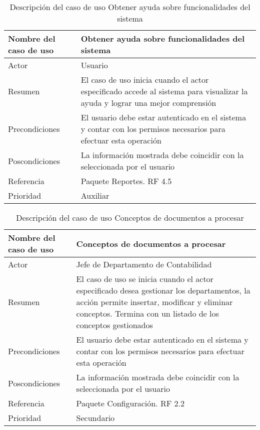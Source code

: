 \begin{table}[H]
	\sf
	\begin{supertabular}{|p{4.5cm}|p{12cm}|}
		\hline
		\textbf{Nombre del caso de uso}
		& \textbf{Obtener ayuda sobre funcionalidades del sistema} \\ \hline
		
		Actor
		& Usuario \\ \hline
		
		Resumen
		& El caso de uso inicia cuando el actor especificado accede al sistema para visualizar la ayuda y lograr una mejor comprensión \\ \hline
		
		Precondiciones
		& El usuario debe estar autenticado en el sistema y contar con los permisos necesarios para efectuar esta operación \\ \hline
		
		Poscondiciones
		& La información mostrada debe coincidir con la seleccionada por el usuario \\ \hline
		
		Referencia
		& Paquete Reportes. RF 4.5 \\ \hline
		
		Prioridad
		& Auxiliar \\		
		\hline
	\end{supertabular}
	\caption[Descripción del caso de uso Obtener ayuda sobre funcionalidades del sistema]{Descripción del caso de uso Obtener ayuda sobre funcionalidades del sistema}
	\label{table:CU_ObtAyuda}
\end{table}

\begin{table}[H]
	\sf
	\begin{supertabular}{|p{4.5cm}|p{12cm}|}
		\hline
		\textbf{Nombre del caso de uso}
		& \textbf{Conceptos de documentos a procesar} \\ \hline
		
		Actor
		& Jefe de Departamento de Contabilidad \\ \hline
		
		Resumen
		& El caso de uso se inicia cuando el actor especificado desea gestionar los departamentos, la acción permite insertar, modificar y eliminar conceptos. Termina con un listado de los conceptos gestionados \\ \hline
		
		Precondiciones
		& El usuario debe estar autenticado en el sistema y contar con los permisos necesarios para efectuar esta operación \\ \hline
		
		Poscondiciones
		& La información mostrada debe coincidir con la seleccionada por el usuario \\ \hline
		
		Referencia
		& Paquete Configuración. RF 2.2 \\ \hline
		
		Prioridad
		& Secundario \\		
		\hline
	\end{supertabular}
	\caption[Descripción del caso de uso Conceptos de documentos a procesar]{Descripción del caso de uso Conceptos de documentos a procesar}
	\label{table:CU_ConcDoc}
\end{table}

